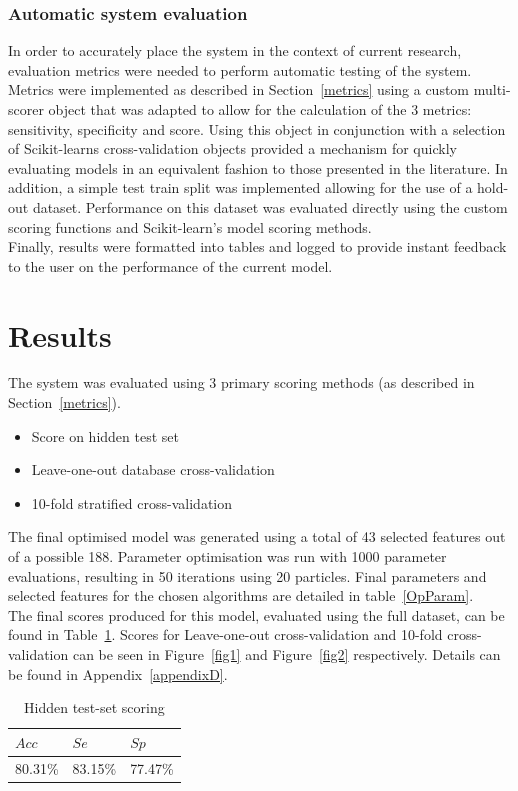 \documentclass[titlepage, 12pt]{scrartcl} \usepackage{enumitem}
\begin{document}
\subsubsection{Automatic system evaluation}
In order to accurately place the system in the context of current research,
evaluation metrics were needed to perform automatic testing of the system.
Metrics were implemented as described in Section~\ref{metrics} using a custom
multi-scorer object that was adapted to allow for the calculation of the 3
metrics: sensitivity, specificity and score. Using this object in conjunction
with a selection of Scikit-learns cross-validation objects provided a mechanism
for quickly evaluating models in an equivalent fashion to those presented in
the literature. In addition, a simple test train split was implemented allowing
for the use of a hold-out dataset. Performance on this dataset was evaluated
directly using the custom scoring functions and Scikit-learn's model scoring
methods.\\
Finally, results were formatted into tables and logged to provide instant
feedback to the user on the performance of the current model.

\section{Results}\label{Eval}
The system was evaluated using 3 primary scoring methods (as described in
Section~\ref{metrics}).
\begin{itemize}
    \item Score on hidden test set
    \item Leave-one-out database cross-validation
    \item 10-fold stratified cross-validation
\end{itemize}

The final optimised model was generated using a total of 43 selected features
out of a possible 188. Parameter optimisation was run with 1000 parameter
evaluations, resulting in 50 iterations using 20 particles. Final parameters
and selected features 
for the chosen algorithms are detailed in table~\ref{OpParam}.\\
The final scores produced for this model, evaluated using the full dataset, can
be found in Table~\ref{TestSet}. Scores for Leave-one-out cross-validation and
10-fold cross-validation can be seen in Figure~\ref{fig1} and Figure~\ref{fig2}
respectively. Details can be found in Appendix~\ref{appendixD}.

\begin{table}[H]
\centering
\caption{Hidden test-set scoring}
\label{TestSet}
\begin{tabular}{@{}lll@{}}
\toprule
$Acc$  & $Se$    & $Sp$    \\ \midrule
80.31\% & 83.15\% & 77.47\% \\ \bottomrule
\end{tabular}
\end{table}
\end{document}
